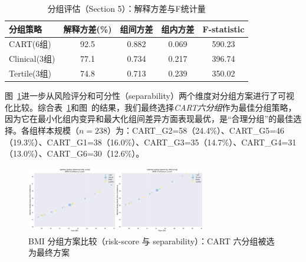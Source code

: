 \documentclass[withoutpreface]{cumcmthesis}
\begin{document}
\begin{table}[htbp]
\centering
\caption{分组评估（Section 5）：解释方差与F统计量}
\label{tab:p2_group_eval}
\begin{tabular}{@{}lcccc@{}}
\toprule
分组策略 & 解释方差(\%) & 组间方差 & 组内方差 & F-statistic \\
\midrule
CART(6组) & 92.5 & 0.882 & 0.069 & 590.23 \\
Clinical(3组) & 77.1 & 0.734 & 0.217 & 396.74 \\
Tertile(3组) & 74.8 & 0.713 & 0.239 & 350.02 \\
\bottomrule
\end{tabular}
\end{table}

图~\ref{fig:p2_grouping}进一步从风险评分和可分性（separability）两个维度对分组方案进行了可视化比较。综合表~\ref{tab:p2_group_eval}和图~\label{fig:p2_grouping}的结果，我们最终选择\emph{CART六分组}作为最佳分组策略，因为它在最小化组内变异和最大化组间差异方面表现最优，是“合理分组”的最佳选择。各组样本规模（$n=238$）为：CART\_G2=\num{58}（24.4\%）、CART\_G5=\num{46}（19.3\%）、CART\_G1=\num{38}（16.0\%）、CART\_G3=\num{35}（14.7\%）、CART\_G4=\num{31}（13.0\%）、CART\_G6=\num{30}（12.6\%）。

\begin{figure}[htbp]
\centering
\includegraphics[width=0.7\textwidth]{output/figures/p2_bmi_groups_comparison.png}
\caption{BMI 分组方案比较（risk-score 与 separability）：CART 六分组被选为最终方案}
\label{fig:p2_grouping}
\end{figure}
\end{document}
